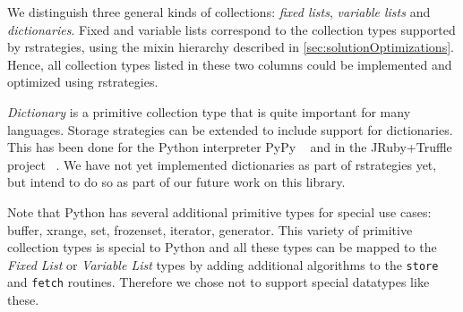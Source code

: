 \documentclass[english,10pt]{sigplanconf}
\begin{document}
We distinguish three general kinds of collections: \emph{fixed lists},
\emph{variable lists} and \emph{dictionaries}. Fixed and variable lists
correspond to the collection types supported by rstrategies, using the mixin
hierarchy described in \autoref{sec:solutionOptimizations}. Hence, all
collection types listed in these two columns could be implemented and optimized
using rstrategies.

\emph{Dictionary} is a primitive collection type that is quite important for
many languages. Storage strategies can be extended to include support for
dictionaries. This has been done for the Python interpreter PyPy
~\cite{strategies} and in the JRuby+Truffle project
~\cite{smallDataStructures}. We have not yet implemented dictionaries as part
of rstrategies yet, but intend to do so as part of our future work on this
library.

Note that Python has several additional primitive types for special use cases:
{buffer}, {xrange}, {set}, {frozenset}, {iterator}, {generator}. This variety
of primitive collection types is special to Python and all these types can be
mapped to the \emph{Fixed List} or \emph{Variable List} types by adding
additional algorithms to the \lstinline{store} and \lstinline{fetch} routines.
Therefore we chose not to support special datatypes like these.




\end{document}
